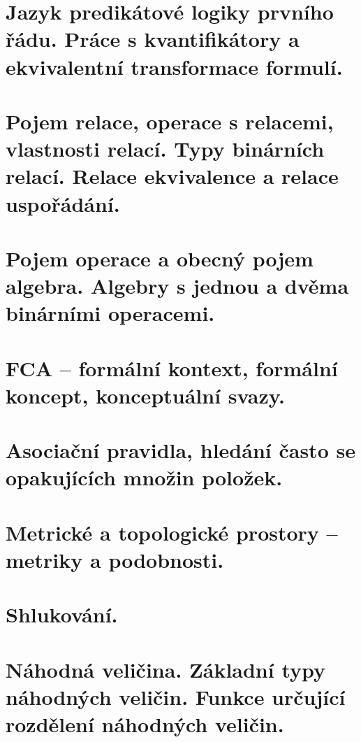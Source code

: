\documentclass[twoside]{book}
\begin{document}
\chapter{Jazyk predikátové logiky prvního řádu. Práce s kvantifikátory a ekvivalentní transformace formulí.}

\clearpage

\chapter{Pojem relace, operace s relacemi, vlastnosti relací. Typy binárních relací. Relace ekvivalence a relace uspořádání.}

\clearpage

\chapter{Pojem operace a obecný pojem algebra. Algebry s jednou a dvěma binárními operacemi.}

\clearpage

\chapter{FCA – formální kontext, formální koncept, konceptuální svazy.}

\clearpage

\chapter{Asociační pravidla, hledání často se opakujících množin položek.}


\chapter{Metrické a topologické prostory – metriky a podobnosti.}

\clearpage

\chapter{Shlukování.}

\clearpage

\chapter{Náhodná veličina. Základní typy náhodných veličin. Funkce určující rozdělení náhodných veličin.}

\clearpage
\end{document}
